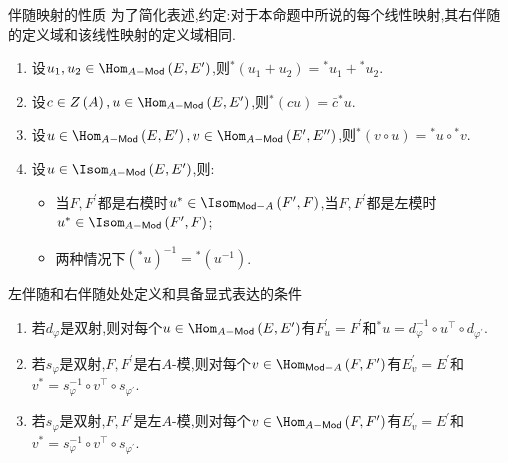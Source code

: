 \begin{proposition}{伴随映射的性质}{}
	为了简化表述,约定:对于本命题中所说的每个线性映射,其右伴随的定义域和该线性映射的定义域相同.
	\begin{enumerate}
		\item 设$u_{1},u_{2}\in\Hom_{A-\mathsf{Mod}}\left(E,E^{\prime}\right)$,则${}^{\ast}\left(u_{1}+u_{2}\right)={}^{\ast}u_{1}+{}^{\ast}u_{2}$.
		\item 设$c\in Z\left(A\right),u\in\Hom_{A-\mathsf{Mod}}\left(E,E^{\prime}\right)$,则${}^{\ast}\left(cu\right)=\bar{c}{}^{\ast}u$.
		\item 设$u\in\Hom_{A-\mathsf{Mod}}\left(E,E^{\prime}\right),v\in\Hom_{A-\mathsf{Mod}}\left(E^{\prime},E^{\prime\prime}\right)$,则${}^{\ast}\left(v\circ u\right)={}^{\ast}u\circ{}^{\ast}v$.
		\item 设$u\in\Isom_{A-\mathsf{Mod}}\left(E,E^{\prime}\right)$,则:
		\begin{itemize}
			\item 当$F,F^{\prime}$都是右模时$u^{\ast}\in\Isom_{\mathsf{Mod}-A}\left(F^{\prime},F\right)$,当$F,F^{\prime}$都是左模时$u^{\ast}\in\Isom_{A-\mathsf{Mod}}\left(F^{\prime},F\right)$;
			\item 两种情况下$\left({}^{\ast}u\right)^{-1}={}^{\ast}\left(u^{-1}\right)$.
		\end{itemize}
	\end{enumerate}
\end{proposition}

\begin{proposition}{左伴随和右伴随处处定义和具备显式表达的条件}{}
	\begin{enumerate}
		\item 若$d_{\varphi}$是双射,则对每个$u\in\Hom_{A-\mathsf{Mod}}\left(E,E^{\prime}\right)$有$F_{u}^{\prime}=F^{\prime}$和${}^{\ast}u=d_{\varphi}^{-1}\circ u^{\top}\circ d_{\varphi^{\prime}}$.
		\item 若$s_{\varphi}$是双射,$F,F^{\prime}$是右$A$-模,则对每个$v\in\Hom_{\mathsf{Mod}-A}\left(F,F^{\prime}\right)$有$E_{v}^{\prime}=E^{\prime}$和$v^{\ast}=s_{\varphi}^{-1}\circ v^{\top}\circ s_{\varphi^{\prime}}$.
		\item 若$s_{\varphi}$是双射,$F,F^{\prime}$是左$A$-模,则对每个$v\in\Hom_{A-\mathsf{Mod}}\left(F,F^{\prime}\right)$有$E_{v}^{\prime}=E^{\prime}$和$v^{\ast}=s_{\varphi}^{-1}\circ v^{\top}\circ s_{\varphi^{\prime}}$.
	\end{enumerate}
\end{proposition}

